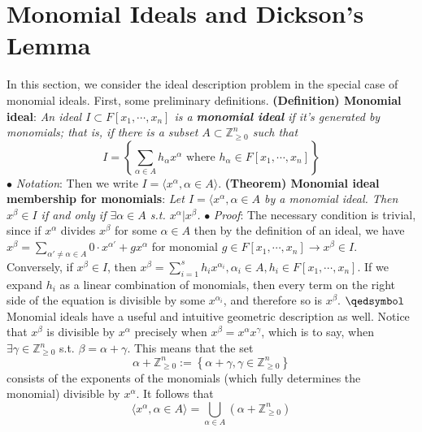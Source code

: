 \documentclass{article}
\begin{document}
\section{Monomial Ideals and Dickson's Lemma}
In this section, we consider the ideal description problem in the special case of monomial ideals. First, some preliminary definitions.
\newline \newline
\textbf{(Definition) Monomial ideal}: \textit{An ideal $ I \subset F[x_1, \cdots, x_n] $ is a \textbf{monomial ideal} if it's generated by monomials; that is, if there is a subset $ A \subset \mathbb{Z}_{\geq 0}^n $ such that}
$$ I = \left\{ \sum_{\alpha \in A} h_\alpha x^\alpha \text{ where } h_\alpha \in F[x_1, \cdots, x_n] \right\} $$
\indent $ \bullet $ \textit{Notation}: Then we write $ I = \langle x^\alpha, \alpha \in A \rangle $.
\newline \newline
\textbf{(Theorem) Monomial ideal membership for monomials}: \textit{Let $ I = \langle x^\alpha, \alpha \in A $ by a monomial ideal. Then $ x^\beta \in I $ if and only if $ \exists \alpha \in A $ s.t. $ x^\alpha | x^\beta $.}
\newline
\indent $ \bullet $ \textit{Proof}: The necessary condition is trivial, since if $ x^\alpha $ divides $ x^\beta $ for some $ \alpha \in A $ then by the definition of an ideal, we have $ x^\beta = \sum_{\alpha' \neq \alpha \in A} 0 \cdot x^{\alpha '} + g x^\alpha $ for monomial $ g \in F[x_1, \cdots, x_n] \rightarrow x^\beta \in I $. Conversely, if $ x^\beta \in I $, then $ x^\beta = \sum_{i = 1}^s h_i x^{\alpha_i}, \alpha_i \in A, h_i \in F[x_1, \cdots, x_n] $. If we expand $ h_i $ as a linear combination of monomials, then every term on the right side of the equation is divisible by some $ x^{\alpha_i} $, and therefore so is $ x^\beta $. $ \qedsymbol $
\newline \newline
Monomial ideals have a useful and intuitive geometric description as well. Notice that $ x^\beta $ is divisible by $ x^\alpha $ precisely when $ x^\beta = x^\alpha x^\gamma $, which is to say, when $ \exists \gamma \in \mathbb{Z}_{\geq 0}^n $ s.t. $ \beta = \alpha + \gamma $. This means that the set
$$ \alpha + \mathbb{Z}_{\geq 0}^n := \left\{ \alpha + \gamma, \gamma \in \mathbb{Z}_{\geq 0}^n \right\} $$
consists of the exponents of the monomials (which fully determines the monomial) divisible by $ x^\alpha $. It follows that
$$ \langle x^\alpha, \alpha \in A \rangle = \bigcup_{\alpha \in A} \left( \alpha + \mathbb{Z}_{\geq 0}^n \right) $$
\end{document}
